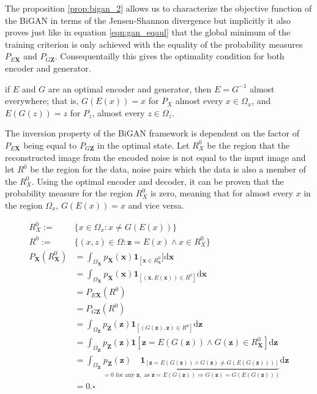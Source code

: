 The proposition \ref{prop:bigan_2} allows us to characterize the objective function of the BiGAN in
terms of the Jensen-Shannon divergence but implicitly it also proves just like in equation
\ref{eqn:gan_eqaul} that the global minimum of the training criterion is only achieved with the
equality of the probability measures $P_{E\mathbf{X}}$ and $P_{G\mathbf{Z}}$. Consequentailly this
gives the optimality condition for both encoder and generator. 

\begin{theorem}
    \label{th:bigan_inv}
    if $E$ and $G$ are an optimal encoder and generator, then $E = G^{-1}$ almost everywhere; that is,
    $G(E(x)) = x$ for $P_X$ almost every $x \in \Omega_x$, and $E(G(z)) = z$ for $P_z$, almost every
    $z \in \Omega_z$. \cite{Donahue2017AdversarialFL}
\end{theorem}

The inversion property of the BiGAN framework is dependent on the factor of $P_{E\mathbf{X}}$ being
equal to $P_{G\mathbf{Z}}$ in the optimal state. Let $R_{X}^{0}$ be the region that the
reconstructed image from the encoded noise is not equal to the input image and let $R^{0}$ be the
region for the data, noise pairs which the data is also a member of the $R^{0}_{X}$. Using the
optimal encoder and decoder, it can be proven that the probability measure for the region
$R^{0}_{X}$ is zero, meaning that for almost every $x$ in the region $\Omega_x$, $G(E(x)) = x$ and
vice versa.


\begin{align}
    R^{0}_{X} :=& \{x \in \Omega_x : x \neq G(E(x))\} \\[5pt]
    R^{0} :=& \{(x,z) \in \Omega : \mathbf{z} = E(x) \land x \in R^{0}_{X}\}\\[5pt]
    P_{\mathbf{X}}\left(R_{\mathbf{X}}^{0}\right) &=\int_{\Omega_{\mathbf{X}}} p_{\mathbf{X}}(\mathbf{x}) \mathbf{1}_{\left[\mathbf{x} \in R_{\mathbf{x}}^{0}\right.} ] \mathrm{d} \mathbf{x} \\[5pt]
    &=\int_{\Omega_{\mathbf{X}}} p_{\mathbf{X}}(\mathbf{x}) \mathbf{1}_{\left[(\mathbf{x}, E(\mathbf{x})) \in R^{0}\right]} \mathrm{d} \mathbf{x} \\[5pt]
    & =P_{E \mathbf{X}}\left(R^{0}\right)\\[5pt]
    & =P_{G \mathbf{Z}}\left(R^{0}\right)\\[5pt]
    & =\int_{\Omega_{\mathbf{Z}}} p_{\mathbf{Z}}(\mathbf{z}) \mathbf{1}_{\left[(G(\mathbf{z}), \mathbf{z}) \in R^{0}\right]} \mathrm{d} \mathbf{z}\\[5pt]
    & =\int_{\Omega_{\mathbf{Z}}} p_{\mathbf{Z}}(\mathbf{z}) \mathbf{1}\left[\mathbf{z}=E(G(\mathbf{z})) \wedge G(\mathbf{z}) \in R_{\mathbf{X}}^{0}\right] \mathrm{d} \mathbf{z}\\[5pt]
    & =\int_{\Omega_{\mathbf{Z}}} \underbrace{p_{\mathbf{Z}}(\mathbf{z}) \quad \mathbf{1}_{[\mathbf{z}=E(G(\mathbf{z})) \wedge G(\mathbf{z}) \neq G(E(G(\mathbf{z})))]}}_{=0 \text { for any } \mathbf{z}, \text { as } \mathbf{z}=E(G(\mathbf{z})) \Longrightarrow G(\mathbf{z})=G(E(G(\mathbf{z})))} \mathrm{d} \mathbf{z}\\[5pt]
    &= 0. \square  \\[5pt]
\end{align}


